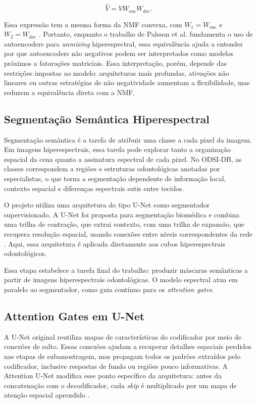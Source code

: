 \documentclass[conference]{IEEEtran}
\begin{document}
\[
\hat{V} = V W_{\mathrm{enc}} W_{\mathrm{dec}}.
\]

Essa expressão tem a mesma forma da NMF convexa, com
$W_1 = W_{\mathrm{enc}}$ e $W_2 = W_{\mathrm{dec}}$
\cite{egendal2024relation}. Portanto, enquanto o trabalho de Palsson et al.
fundamenta o uso de autoencoders para \textit{unmixing} hiperespectral, essa
equivalência ajuda a entender por que autoencoders não negativos podem ser
interpretados como modelos próximos a fatorações matriciais. Essa interpretação,
porém, depende das restrições impostas ao modelo: arquiteturas mais profundas,
ativações não lineares ou outras estratégias de não negatividade aumentam a
flexibilidade, mas reduzem a equivalência direta com a NMF.

\subsection{Segmentação Semântica Hiperespectral}

Segmentação semântica é a tarefa de atribuir uma classe a cada pixel da imagem.
Em imagens hiperespectrais, essa tarefa pode explorar tanto a organização
espacial da cena quanto a assinatura espectral de cada pixel. No ODSI-DB, as
classes correspondem a regiões e estruturas odontológicas anotadas por
especialistas, o que torna a segmentação dependente de informação local,
contexto espacial e diferenças espectrais sutis entre tecidos.

O projeto utiliza uma arquitetura do tipo U-Net como segmentador supervisionado.
A U-Net foi proposta para segmentação biomédica e combina uma trilha de
contração, que extrai contexto, com uma trilha de expansão, que recupera
resolução espacial, usando conexões entre níveis correspondentes da rede
\cite{ronneberger2015unet}. Aqui, essa arquitetura é aplicada diretamente aos
cubos hiperespectrais odontológicos.

Essa etapa estabelece a tarefa final do trabalho: produzir máscaras semânticas a
partir de imagens hiperespectrais odontológicas. O modelo espectral atua em
paralelo ao segmentador, como guia contínuo para os \textit{attention gates}.

\subsection{Attention Gates em U-Net}

A U-Net original reutiliza mapas de características do codificador por meio de
conexões de salto. Essas conexões ajudam a recuperar detalhes espaciais perdidos
nas etapas de subamostragem, mas propagam todos os padrões extraídos pelo
codificador, inclusive respostas de fundo ou regiões pouco informativas. A
Attention U-Net modifica esse ponto específico da arquitetura: antes da
concatenação com o decodificador, cada \textit{skip} é multiplicado por um mapa
de atenção espacial aprendido \cite{oktay2018attentionunet}.
\end{document}

